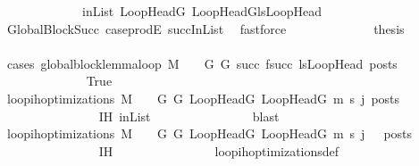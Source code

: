 \begin{isabellebody}
\ \ \ \ \ \ \ \ \ \ \ \ \ inList{\isacharcolon}{\kern0pt}\ {\isachardoublequoteopen}{\isacharparenleft}{\kern0pt}LoopHeadG{\isacharcomma}{\kern0pt}\ LoopHeadG{\isacharprime}{\kern0pt}{\isacharparenright}{\kern0pt}{\isasymin}lsLoopHead{\isachardoublequoteclose}\isanewline
\ \ \ \ \ \ \ \ \ \ \ \ \isamarkupfalse%
\ GlobalBlockSucc\ case{\isacharunderscore}{\kern0pt}prodE\ succInList\ \isamarkupfalse%
\ fastforce\isanewline
\ \ \ \ \ \ \ \ \ \ \isamarkupfalse%
\ \isamarkupfalse%
\ {\isacharquery}{\kern0pt}thesis\isanewline
\ \ \ \ \ \ \ \ \ \ \isamarkupfalse%
\ {\isacharparenleft}{\kern0pt}cases\ {\isachardoublequoteopen}global{\isacharunderscore}{\kern0pt}block{\isacharunderscore}{\kern0pt}lemma{\isacharunderscore}{\kern0pt}loop\ M\ {\isasymLambda}\ {\isasymGamma}\ {\isasymOmega}\ G\ G{\isacharprime}{\kern0pt}\ succ\ {\isacharparenleft}{\kern0pt}f{\isacharparenleft}{\kern0pt}succ{\isacharparenright}{\kern0pt}{\isacharparenright}{\kern0pt}\ lsLoopHead\ posts{\isachardoublequoteclose}{\isacharparenright}{\kern0pt}\isanewline
\ \ \ \ \ \ \ \ \ \ \ \ \isamarkupfalse%
\ True\isanewline
\ \ \ \ \ \ \ \ \ \ \ \ \isamarkupfalse%
\ {\isachardoublequoteopen}loop{\isacharunderscore}{\kern0pt}ih{\isacharunderscore}{\kern0pt}optimizations\ M\ {\isasymLambda}\ {\isasymGamma}\ {\isasymOmega}\ G\ G{\isacharprime}{\kern0pt}\ LoopHeadG\ LoopHeadG{\isacharprime}{\kern0pt}\ m{\isacharprime}{\kern0pt}\ s{\isacharprime}{\kern0pt}\ j\ posts{\isachardoublequoteclose}\isanewline
\ \ \ \ \ \ \ \ \ \ \ \ \ \ \isamarkupfalse%
\ IH\ inList\isanewline
\ \ \ \ \ \ \ \ \ \ \ \ \ \ \isamarkupfalse%
\ blast\ \isanewline
\ \ \ \ \ \ \ \ \ \ \ \ \isamarkupfalse%
\ {\isachardoublequoteopen}loop{\isacharunderscore}{\kern0pt}ih{\isacharunderscore}{\kern0pt}optimizations\ M\ {\isasymLambda}\ {\isasymGamma}\ {\isasymOmega}\ G\ G{\isacharprime}{\kern0pt}\ LoopHeadG\ LoopHeadG{\isacharprime}{\kern0pt}\ m{\isacharprime}{\kern0pt}\ s{\isacharprime}{\kern0pt}\ {\isacharparenleft}{\kern0pt}j\ {\isacharminus}{\kern0pt}\ {}{\isacharparenright}{\kern0pt}\ posts{\isachardoublequoteclose}\isanewline
\ \ \ \ \ \ \ \ \ \ \ \ \ \ \isamarkupfalse%
\ IH\isanewline
\ \ \ \ \ \ \ \ \ \ \ \ \ \ \isamarkupfalse%
\ loop{\isacharunderscore}{\kern0pt}ih{\isacharunderscore}{\kern0pt}optimizations{\isacharunderscore}{\kern0pt}def\isanewline
\ \ \ \ \ \ \ \ \ \ \ \ \ \ \isamarkupfalse%

\end{isabellebody}
